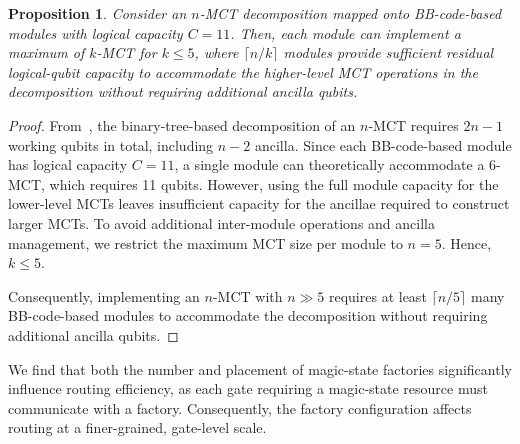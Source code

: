 \documentclass[sigconf]{acmart}
\newtheorem{proposition}{Proposition}
\newcommand{\anik}[1]{%
        \textcolor{blue}{\textbf{Anik:} #1}%
    }
\newcommand{\anik}[1]{}
\begin{document}
\begin{proposition}
\label{prop:prop1}
   Consider an $n$-MCT decomposition mapped onto BB-code-based modules with logical capacity $C=11$. Then, each module can implement a maximum of $k$-MCT for $k \leq 5$, where $\lceil  n/k \rceil$ modules provide sufficient residual logical-qubit capacity to accommodate the higher-level MCT operations in the decomposition without requiring additional ancilla qubits.
\end{proposition}
\begin{proof}
From~\cite{dutta2025pra}, the binary-tree-based decomposition of an $n$-MCT requires $2n-1$ working qubits in total, including $n-2$ ancilla. Since each BB-code-based module has logical capacity $C=11$, a single module can theoretically accommodate a $6$-MCT, which requires 11 qubits. However, using the full module capacity for the lower-level MCTs leaves insufficient capacity for the ancillae required to construct larger MCTs. To avoid additional inter-module operations and ancilla management, we restrict the maximum MCT size per module to $n=5$. Hence, $k\leq 5$.

Consequently, implementing an $n$-MCT with $n\gg 5$ requires at least $\lceil n/5 \rceil$ many BB-code-based modules to accommodate the decomposition without requiring additional ancilla qubits.
\end{proof}

We find that both the number and placement of magic-state factories significantly influence routing efficiency, as each gate requiring a magic-state resource must communicate with a factory. Consequently, the factory configuration affects routing at a finer-grained, gate-level scale.



\end{document}
